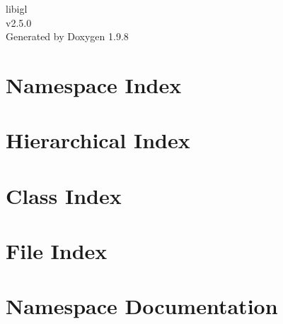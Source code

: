 \documentclass[twoside]{book}
\newcommand{\+}{\discretionary{\mbox{\scriptsize$\hookleftarrow$}}{}{}}
\newcommand{\clearemptydoublepage}{%
    \newpage{\pagestyle{empty}\cleardoublepage}%
  }
\begin{document}
  \raggedbottom
    \hypersetup{pageanchor=false,
                bookmarksnumbered=true,
                pdfencoding=unicode
               }
  \begin{titlepage}
  \vspace*{7cm}
  \begin{center}%
  {\Large libigl}\\
  [1ex]\large v2.\+5.\+0 \\
  \vspace*{1cm}
  {\large Generated by Doxygen 1.9.8}\\
  \end{center}
  \end{titlepage}
  \clearemptydoublepage
  \tableofcontents
  \clearemptydoublepage
  \hypersetup{pageanchor=true}

\chapter{Namespace Index}

\chapter{Hierarchical Index}

\chapter{Class Index}

\chapter{File Index}

\chapter{Namespace Documentation}






















\end{document}
